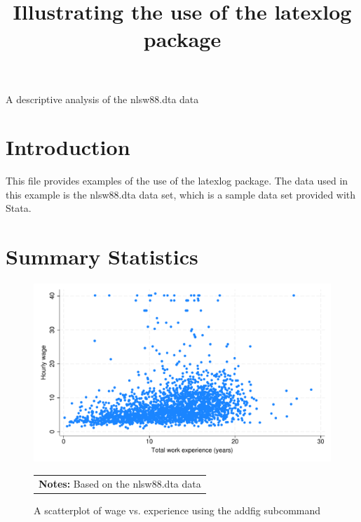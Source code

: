 \documentclass{article}
\begin{document}
\title{Illustrating the use of the latexlog package}
\maketitle
A descriptive analysis of the nlsw88.dta data
\section{Introduction}
This file provides examples of the use of the latexlog package.
The data used in this example is the nlsw88.dta data set, which is a sample data set provided with Stata.
\section{Summary Statistics}
\begin{figure}[H] 
\centering 
\caption{A scatterplot of wage vs. experience using the addfig subcommand} 
\includegraphics[width = .8\textwidth]{./figures/scatter_wage.pdf} \\ 
\begin{tabular}{p{6in}}  
\footnotesize \vspace{2pt} 
  \textbf{Notes:} Based on the nlsw88.dta data 
\end{tabular} 
\end{figure} 
\end{document}
